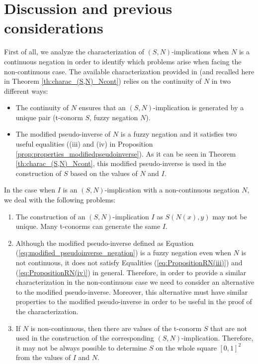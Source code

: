 \section{Discussion and previous considerations}\label{section:objectives&problems}
First of all, we analyze the characterization of $(S,N)$-implications when $N$ is a continuous negation in order to identify which problems arise when facing the non-continuous case. The available characterization provided in \cite{Baczynski2007} (and recalled here in Theorem \ref{th:charac_(S,N)_Ncont}) relies on the continuity of $N$ in two different ways:
\begin{itemize}
	\item The continuity of $N$ ensures that an $(S,N)$-implication is generated by a unique pair (t-conorm $S$, fuzzy negation $N$).
	\item The modified pseudo-inverse of $N$ is a fuzzy negation and it satisfies two useful equalities ((iii) and (iv) in Proposition \ref{prop:properties_modifiedpseudoinverse}). As it can be seen in Theorem \ref{th:charac_(S,N)_Ncont}, this modified pseudo-inverse is used in the construction of $S$ based on the values of $N$ and $I$.
\end{itemize}
In the case when $I$ is an $(S,N)$-implication with a non-continuous negation $N$, we deal with the following problems:
\begin{enumerate}[label=\arabic*.]
	\item The construction of an $(S,N)$-implication $I$ as $S(N(x),y)$ may not be unique. Many t-conorms can generate the same $I$.
	\item Although the modified pseudo-inverse defined as Equation (\ref{eq:modified_pseudoinverse_negation}) is a fuzzy negation even when $N$ is not continuous, it does not satisfy Equalities (\ref{eq:PropositionRN(iii)}) and (\ref{eq:PropositionRN(iv)}) in general.  Therefore, in order to provide a similar characterization in the non-continuous case we need to consider an alternative to the modified pseudo-inverse. Moreover, this alternative must have similar properties to the modified pseudo-inverse in order to be useful in the proof of the characterization.
	\item If $N$ is non-continuous, then there are values of the t-conorm $S$ that are not used in the construction of the corresponding $(S,N)$-implication. Therefore, it may not be always possible to determine $S$ on the whole square $[0,1]^2$ from the values of $I$ and $N$. 
\end{enumerate}

